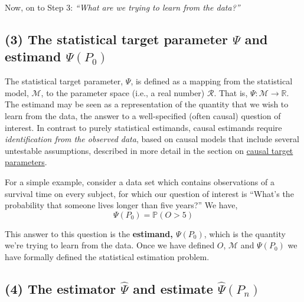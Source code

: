 \documentclass[
  12pt, krantz2,
]{book}
\theoremstyle{definition}
\theoremstyle{definition}
\theoremstyle{definition}
\newcommand{\1}{\mathbbm{1}}
\begin{document}
Now, on to Step 3: \emph{``What are we trying to learn from the data?''}

\hypertarget{the-statistical-target-parameter-psi-and-estimand-psip_0}{%
\subsection*{\texorpdfstring{(3) The statistical target parameter \(\Psi\) and estimand \(\Psi(P_0)\)}{(3) The statistical target parameter \textbackslash Psi and estimand \textbackslash Psi(P\_0)}}\label{the-statistical-target-parameter-psi-and-estimand-psip_0}}


The statistical target parameter, \(\Psi\), is defined as a mapping from the
statistical model, \(\mathcal{M}\), to the parameter space (i.e., a real number)
\(\mathcal{R}\). That is, \(\Psi: \mathcal{M}\rightarrow\mathbb{R}\). The estimand
may be seen as a representation of the quantity that we wish to learn from the
data, the answer to a well-specified (often causal) question of interest. In
contrast to purely statistical estimands, causal estimands require
\emph{identification from the observed data}, based on causal models that include
several untestable assumptions, described in more detail in the section on
\protect\hyperlink{causal}{causal target parameters}.

For a simple example, consider a data set which contains observations of a
survival time on every subject, for which our question of interest is ``What's
the probability that someone lives longer than five years?'' We have,
\begin{equation*}
  \Psi(P_0) = \mathbb{P}(O > 5)
\end{equation*}

This answer to this question is the \textbf{estimand, \(\Psi(P_0)\)}, which is the
quantity we're trying to learn from the data. Once we have defined \(O\),
\(\mathcal{M}\) and \(\Psi(P_0)\) we have formally defined the statistical
estimation problem.

\hypertarget{the-estimator-hatpsi-and-estimate-hatpsip_n}{%
\subsection*{\texorpdfstring{(4) The estimator \(\hat{\Psi}\) and estimate \(\hat{\Psi}(P_n)\)}{(4) The estimator \textbackslash hat\{\textbackslash Psi\} and estimate \textbackslash hat\{\textbackslash Psi\}(P\_n)}}\label{the-estimator-hatpsi-and-estimate-hatpsip_n}}
\end{document}
